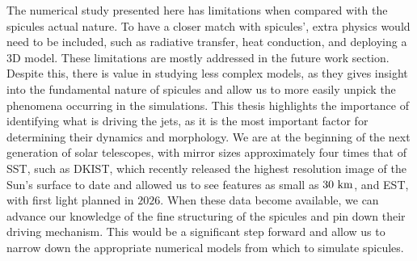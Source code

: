 %
The numerical study presented here has limitations when compared with the spicules actual nature. To have a closer match with spicules', extra physics would need to be included, such as radiative transfer, heat conduction, and deploying a 3D model. These limitations are mostly addressed in the future work section. Despite this, there is value in studying less complex models, as they gives insight into the fundamental nature of spicules and allow us to more easily unpick the phenomena occurring in the simulations. This thesis highlights the importance of identifying what is driving the jets, as it is the most important factor for determining their dynamics and morphology. We are at the beginning of the next generation of solar telescopes, with mirror sizes approximately four times that of SST, such as DKIST, which recently released the highest resolution image of the Sun's surface to date and allowed us to see features as small as $30~\rm{km}$, and EST, with first light planned in $2026$. When these data become available, we can advance our knowledge of the fine structuring of the spicules and pin down their driving mechanism. This would be a significant step forward and allow us to narrow down the appropriate numerical models from which to simulate spicules. 
